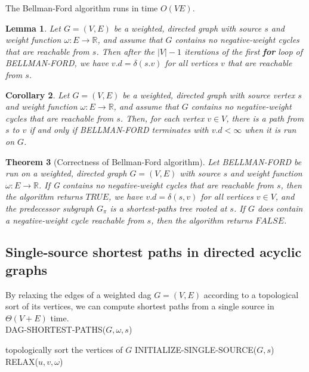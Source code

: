 \documentclass[12pt]{article}
\newtheorem{theorem}{Theorem}
\newtheorem{lemma}[theorem]{Lemma}
\newtheorem{corollary}[theorem]{Corollary}
\begin{document}
The Bellman-Ford algorithm runs in time $O(VE)$. \\

\begin{lemma}
  Let $G = (V,E)$ be a weighted, directed graph with source $s$ and weight function $\omega : E \rightarrow \mathbb{R}$, and assume that $G$ contains no negative-weight cycles that are reachable from $s$. Then after the $|V| - 1$ iterations of the first \textbf{for} loop of BELLMAN-FORD, we have $v.d = \delta(s.v)$ for all vertices $v$ that are reachable from $s$.
\end{lemma}

\begin{corollary}
  Let $G = (V,E)$ be a weighted, directed graph with source vertex $s$ and weight function $\omega : E \rightarrow \mathbb{R}$, and assume that $G$ contains  no negative-weight cycles that are reachable from $s$. Then, for each vertex $v \in V$, there is a path from $s$ to $v$ if and only if BELLMAN-FORD terminates with $v.d < \infty$ when it is run on $G$.
\end{corollary}

\begin{theorem} [Correctness of Bellman-Ford algorithm]
  Let BELLMAN-FORD be run on a weighted, directed graph $G = (V,E)$ with source $s$ and weight function $\omega : E \rightarrow \mathbb{R}$. If G contains no negative-weight cycles that are reachable from $s$, then the algorithm returns $TRUE$, we have $v.d = \delta(s,v)$ for all vertices $v \in V$, and the predecessor subgraph $G_{\pi}$ is a shortest-paths tree rooted at $s$. If $G$ does contain a negative-weight cycle reachable from $s$, then the algorithm returns $FALSE$.
\end{theorem}

\subsection{Single-source shortest paths in directed acyclic graphs}

By relaxing the edges of a weighted dag $G = (V,E)$ according to a topological sort of its vertices, we can compute shortest paths from a single source in $\Theta(V+E)$ time. \\

DAG-SHORTEST-PATHS($G, \omega, s$)
\begin{algorithmic} [1]
\State topologically sort the vertices of $G$
\State INITIALIZE-SINGLE-SOURCE($G,s$)
		\State RELAX($u, v, \omega$)
        \EndFor
\EndFor
\end{algorithmic}
\end{document}
